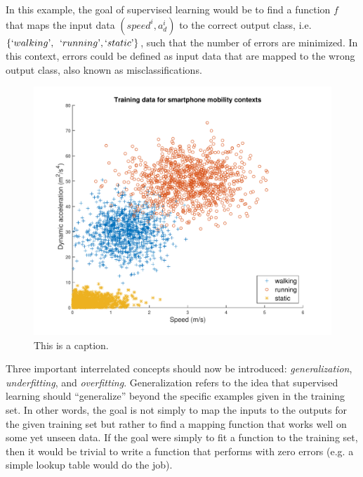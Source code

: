 %
In this example, the goal of supervised learning would be to find a function $f$ that maps the input data $(speed^i,a_d^i)$ to the correct output class, i.e.  $\{`walking\textrm',$ $`running\textrm',`static\textrm'\}$, such that the number of errors are minimized. In this context, errors could be defined as input data that are mapped to the wrong output class, also known as misclassifications.
%
\begin{figure}

\begin{center}
    \includegraphics[width=1.0\textwidth]{figChapter3-1}
  \end{center}
  \caption[Data from smartphone]{This is a caption.}
  \label{fig:data-from-phone-supervised}
\end{figure}

Three important interrelated concepts should now be introduced: \emph{generalization}, \emph{underfitting}, and \emph{overfitting}. Generalization refers to the idea that supervised learning should ``generalize'' beyond the specific examples given in the training set. In other words, the goal is not simply to map the inputs to the outputs for the given training set but rather to find a mapping function that works well on some yet unseen data. If the goal were simply to fit a function to the training set, then it would be trivial to write a function that performs with zero errors (e.g. a simple lookup table would do the job).


